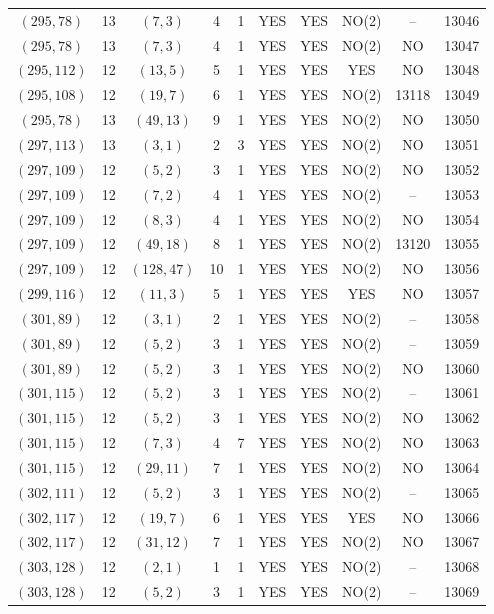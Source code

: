 \begin{longtable}{|c|c|c|c|c|c|c|c|c|c|}
$(295, 78)$ & 13 & $(7, 3)$ & 4 & 1 & YES & YES & NO(2) & -- & 13046\\
$(295, 78)$ & 13 & $(7, 3)$ & 4 & 1 & YES & YES & NO(2) & NO & 13047\\
$(295, 112)$ & 12 & $(13, 5)$ & 5 & 1 & YES & YES & YES & NO & 13048\\
$(295, 108)$ & 12 & $(19, 7)$ & 6 & 1 & YES & YES & NO(2) & 13118 & 13049\\
$(295, 78)$ & 13 & $(49, 13)$ & 9 & 1 & YES & YES & NO(2) & NO & 13050\\
$(297, 113)$ & 13 & $(3, 1)$ & 2 & 3 & YES & YES & NO(2) & NO & 13051\\
$(297, 109)$ & 12 & $(5, 2)$ & 3 & 1 & YES & YES & NO(2) & NO & 13052\\
$(297, 109)$ & 12 & $(7, 2)$ & 4 & 1 & YES & YES & NO(2) & -- & 13053\\
$(297, 109)$ & 12 & $(8, 3)$ & 4 & 1 & YES & YES & NO(2) & NO & 13054\\
$(297, 109)$ & 12 & $(49, 18)$ & 8 & 1 & YES & YES & NO(2) & 13120 & 13055\\
$(297, 109)$ & 12 & $(128, 47)$ & 10 & 1 & YES & YES & NO(2) & NO & 13056\\
$(299, 116)$ & 12 & $(11, 3)$ & 5 & 1 & YES & YES & YES & NO & 13057\\
$(301, 89)$ & 12 & $(3, 1)$ & 2 & 1 & YES & YES & NO(2) & -- & 13058\\
$(301, 89)$ & 12 & $(5, 2)$ & 3 & 1 & YES & YES & NO(2) & -- & 13059\\
$(301, 89)$ & 12 & $(5, 2)$ & 3 & 1 & YES & YES & NO(2) & NO & 13060\\
$(301, 115)$ & 12 & $(5, 2)$ & 3 & 1 & YES & YES & NO(2) & -- & 13061\\
$(301, 115)$ & 12 & $(5, 2)$ & 3 & 1 & YES & YES & NO(2) & NO & 13062\\
$(301, 115)$ & 12 & $(7, 3)$ & 4 & 7 & YES & YES & NO(2) & NO & 13063\\
$(301, 115)$ & 12 & $(29, 11)$ & 7 & 1 & YES & YES & NO(2) & NO & 13064\\
$(302, 111)$ & 12 & $(5, 2)$ & 3 & 1 & YES & YES & NO(2) & -- & 13065\\
$(302, 117)$ & 12 & $(19, 7)$ & 6 & 1 & YES & YES & YES & NO & 13066\\
$(302, 117)$ & 12 & $(31, 12)$ & 7 & 1 & YES & YES & NO(2) & NO & 13067\\
$(303, 128)$ & 12 & $(2, 1)$ & 1 & 1 & YES & YES & NO(2) & -- & 13068\\
$(303, 128)$ & 12 & $(5, 2)$ & 3 & 1 & YES & YES & NO(2) & -- & 13069\\

\end{longtable}
